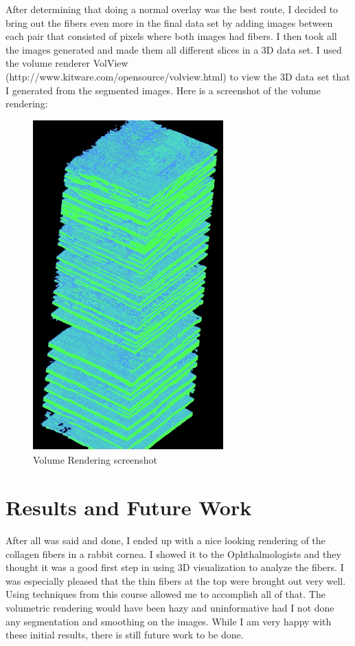 \documentclass[11pt,psfig]{article}
\begin{document}
After determining that doing a normal overlay was the best route, I decided to bring out the fibers even more in the final data set by adding images between each pair that consisted of pixels where both images had fibers. I then took all the images generated and made them all different slices in a 3D data set. I used the volume renderer VolView (http://www.kitware.com/opensource/volview.html) to view the 3D data set that I generated from the segmented images. Here is a screenshot of the volume rendering:
\begin{figure}[H]
\centering
\includegraphics[height=5in]{volumeRendering.jpg}
\caption{Volume Rendering screenshot}
\end{figure}

\section{Results and Future Work}

After all was said and done, I ended up with a nice looking rendering of the collagen fibers in a rabbit cornea. I showed it to the Ophthalmologists and they thought it was a good first step in using 3D visualization to analyze the fibers. I was especially pleased that the thin fibers at the top were brought out very well. Using techniques from this course allowed me to accomplish all of that. The volumetric rendering would have been hazy and uninformative had I not done any segmentation and smoothing on the images. While I am very happy with these initial results, there is still future work to be done. 
\end{document}
